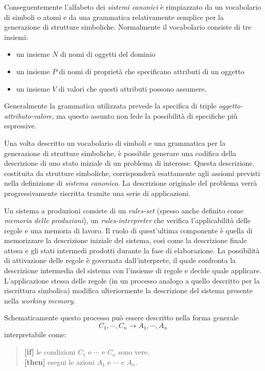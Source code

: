 Conseguentemente l'alfabeto dei \emph{sistemi canonici} è rimpiazzato da un vocabolario di simboli o atomi e da una grammatica relativamente semplice per la generazione di strutture simboliche. Normalmente il vocabolario consiste di tre insiemi:

\begin{itemize}
	\item un insieme $N$ di nomi di oggetti del dominio
	\item un insieme $P$ di nomi di proprietà che specificano attributi di un oggetto
	\item un insieme $V$ di valori che questi attributi possono assumere.
\end{itemize}

Generalmente la grammatica utilizzata prevede la specifica di triple \emph{oggetto-attributo-valore}, ma questo assunto non lede la possibilità di specifiche più espressive.

Una volta descritto un vocabolario di simboli e una grammatica per la generazione di strutture simboliche, è possibile generare una codifica della descrizione di uno stato iniziale di un problema di interesse. Questa descrizione, costituita da strutture simboliche, corrisponderà esattamente agli assiomi previsti nella definizione di \emph{sistema canonico}. La descrizione originale del problema verrà progressivamente riscritta tramite una serie di applicazioni.

Un sistema a produzioni consiste di un \emph{rules-set} (spesso anche definito come \emph{memoria delle produzioni}), un \emph{rules-interpreter} che verifica l'applicabilità delle regole e una memoria di lavoro. Il ruolo di quest'ultima componente è quella di memorizzare la descrizione iniziale del sistema, così come la descrizione finale attesa e gli stati intermedi prodotti durante la fase di elaborazione. La possibilità di attivazione delle regole è governata dall'interprete, il quale confronta la descrizione intermedia del sistema con l'insieme di regole e decide quale applicare. L'applicazione stessa delle regole (in un processo analogo a quello descritto per la riscrittura simbolica) modifica ulteriormente la descrizione del sistema presente nella \emph{working memory}.

Schematicamente questo processo può essere descritto nella forma generale
\[
C_1, \cdots, C_n \rightarrow A_1, \cdots, A_n
\]
interpretabile come:
\begin{quote}
	{\bfseries [if]} le condizioni $C_1$ e $\cdots$ e $C_n$ sono vere,\\
	{\bfseries [then]} esegui le azioni $A_1$ e $\cdots$ e $A_n$.
\end{quote}

